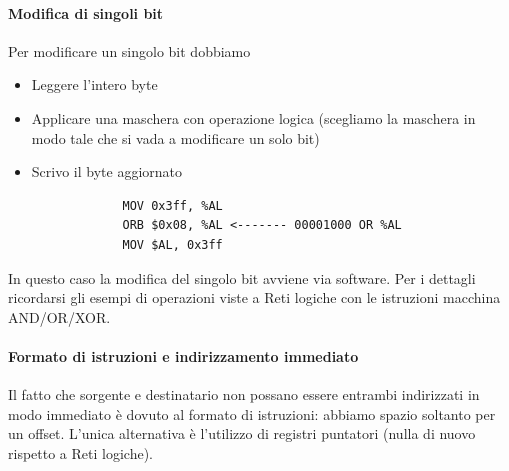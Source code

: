 			\paragraph{Modifica di singoli bit} Per modificare un singolo bit dobbiamo
			\begin{itemize}
				\item Leggere l'intero byte
				\item Applicare una maschera con operazione logica (scegliamo la maschera in modo tale che si vada a modificare un solo bit)
				\item Scrivo il byte aggiornato
			\end{itemize}
			\begin{verbatim}
				MOV 0x3ff, %AL
				ORB $0x08, %AL <------- 00001000 OR %AL
				MOV $AL, 0x3ff
			\end{verbatim}
			In questo caso la modifica del singolo bit avviene via software. Per i dettagli ricordarsi gli esempi di operazioni viste a Reti logiche con le istruzioni macchina AND/OR/XOR.
			\paragraph{Formato di istruzioni e indirizzamento immediato} Il fatto che sorgente e destinatario non possano essere entrambi indirizzati in modo immediato è dovuto al formato di istruzioni: abbiamo spazio soltanto per un offset. L'unica alternativa è l'utilizzo di registri puntatori (nulla di nuovo rispetto a Reti logiche).
